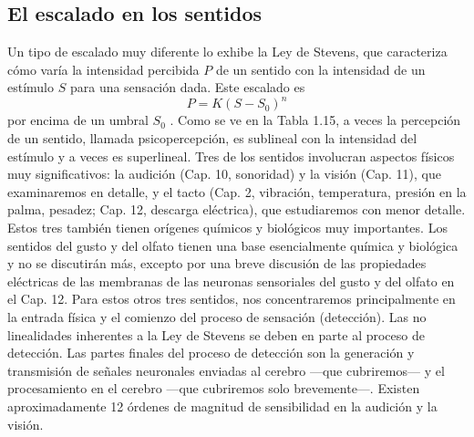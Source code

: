 \documentclass[12pt]{book}
\begin{document}
\subsection{El escalado en los sentidos}

Un tipo de escalado muy diferente lo exhibe la Ley de Stevens, que caracteriza cómo varía la intensidad percibida $P$ de un sentido con la intensidad de un estímulo $S$ para una sensación dada. Este escalado es
\begin{equation}
P = K(S - S_0)^n
\label{eq:1.6}
\end{equation}
por encima de un umbral $S_0$ \cite{35, 36}. Como se ve en la Tabla 1.15, a veces la percepción de un sentido, llamada psicopercepción, es sublineal con la intensidad del estímulo y a veces es superlineal. Tres de los sentidos involucran aspectos físicos muy significativos: la audición (Cap. 10, sonoridad) y la visión (Cap. 11), que examinaremos en detalle, y el tacto (Cap. 2, vibración, temperatura, presión en la palma, pesadez; Cap. 12, descarga eléctrica), que estudiaremos con menor detalle. Estos tres también tienen orígenes químicos y biológicos muy importantes. Los sentidos del gusto y del olfato tienen una base esencialmente química y biológica y no se discutirán más, excepto por una breve discusión de las propiedades eléctricas de las membranas de las neuronas sensoriales del gusto y del olfato en el Cap. 12. Para estos otros tres sentidos, nos concentraremos principalmente en la entrada física y el comienzo del proceso de sensación (detección). Las no linealidades inherentes a la Ley de Stevens se deben en parte al proceso de detección. Las partes finales del proceso de detección son la generación y transmisión de señales neuronales enviadas al cerebro ---que cubriremos--- y el procesamiento en el cerebro ---que cubriremos solo brevemente---. Existen aproximadamente 12 órdenes de magnitud de sensibilidad en la audición y la visión.
\end{document}
